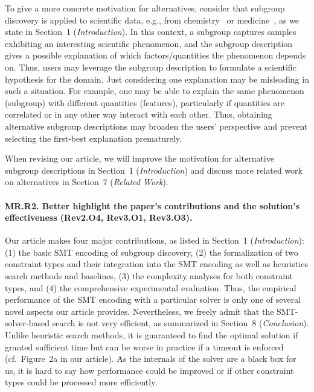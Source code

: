 \documentclass{article}
\begin{document}
To give a more concrete motivation for alternatives, consider that subgroup discovery is applied to scientific data, e.g., from chemistry~\cite{li2021subgroup} or medicine~\cite{esnault2020qfinder}, as we state in Section~1 (\emph{Introduction}).
In this context, a subgroup captures samples exhibiting an interesting scientific phenomenon, and the subgroup description gives a possible explanation of which factors/quantities the phenomenon depends on.
Thus, users may leverage the subgroup description to formulate a scientific hypothesis for the domain.
Just considering one explanation may be misleading in such a situation.
For example, one may be able to explain the same phenomenon (subgroup) with different quantities (features), particularly if quantities are correlated or in any other way interact with each other.
Thus, obtaining alternative subgroup descriptions may broaden the users' perspective and prevent selecting the first-best explanation prematurely.

When revising our article, we will improve the motivation for alternative subgroup descriptions in Section~1 (\emph{Introduction}) and discuss more related work on alternatives in Section~7 (\emph{Related Work}).

\paragraph{MR.R2. Better highlight the paper's contributions and the solution's effectiveness (Rev2.O4, Rev3.O1, Rev3.O3).}

Our article makes four major contributions, as listed in Section~1 (\emph{Introduction}):
(1) the basic SMT encoding of subgroup discovery, (2) the formalization of two constraint types and their integration into the SMT encoding as well as heuristics search methods and baselines, (3) the complexity analyses for both constraint types, and (4) the comprehensive experimental evaluation.
Thus, the empirical performance of the SMT encoding with a particular solver is only one of several novel aspects our article provides.
Nevertheless, we freely admit that the SMT-solver-based search is not very efficient, as summarized in Section~8 (\emph{Conclusion}).
Unlike heuristic search methods, it is guaranteed to find the optimal solution if granted sufficient time but can be worse in practice if a timeout is enforced (cf.~Figure~2a in our article).
As the internals of the solver are a black box for us, it is hard to say how performance could be improved or if other constraint types could be processed more efficiently.
\end{document}

